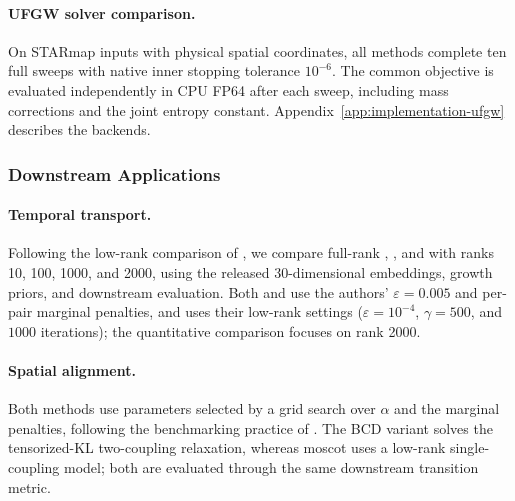 \paragraph{UFGW solver comparison.}
On STARmap inputs with physical spatial coordinates, all methods complete ten full sweeps with native inner stopping tolerance $10^{-6}$.
The common objective is evaluated independently in CPU FP64 after each sweep, including mass corrections and the joint entropy constant.
Appendix~\ref{app:implementation-ufgw} describes the backends.

\subsubsection{Downstream Applications}
\label{app:downstream-protocol}
\paragraph{Temporal transport.}
Following the low-rank comparison of \citet{klein2025mapping}, we compare full-rank \sinkhorn, \ourssparsink, and \ulot with ranks 10, 100, 1000, and 2000, using the released 30-dimensional embeddings, growth priors, and downstream evaluation.
Both \sinkhorn and \ourssparsink use the authors' $\varepsilon=0.005$ and per-pair marginal penalties, and \ulot uses their low-rank settings ($\varepsilon=10^{-4}$, $\gamma=500$, and $1000$ iterations); the quantitative comparison focuses on rank 2000.

\paragraph{Spatial alignment.}
Both methods use parameters selected by a grid search over $\alpha$ and the marginal penalties, following the benchmarking practice of \citet{klein2025mapping}.
The BCD variant solves the tensorized-KL two-coupling relaxation, whereas moscot uses a low-rank single-coupling model; both are evaluated through the same downstream transition metric.

